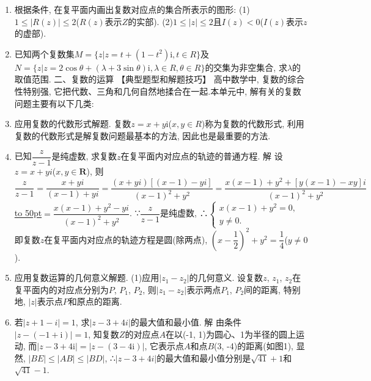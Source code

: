 \documentclass[10pt,a4paper]{article}
\newcommand{\blank}[1]{\underline{\hbox to #1pt{}}}
\begin{document}
\begin{enumerate}[1.]
\item 根据条件, 在复平面内画出复数对应点的集合所表示的图形:
(1)$1\le|R(z)|\le 2$($R(z)$表示$Z$的实部).
(2)$1\le|z|\le 2$且$I(z)<0$($I(z)$表示$z$的虚部).
\item 已知两个复数集$M=\{z|z=t+(1-t^2)\mathrm{i},t\in R\}$及$N=\{z|z=2\cos \theta +(\lambda +3\sin \theta)\mathrm{i},\lambda \in R,\theta \in R\}$的交集为非空集合, 求$\lambda$的取值范围.
二、复数的运算
【典型题型和解题技巧】
高中数学中, 复数的综合性特别强, 它把代数、三角和几何自然地揉合在一起.本单元中, 解有关的复数问题主要有以下几类:
\item 应用复数的代数形式解题.
复数$z=x+y\mathrm{i}$($x,y\in R$)称为复数的代数形式, 利用复数的代数形式是解复数问题最基本的方法, 因此也是最重要的方法.
\item 已知$\dfrac z{z-1}$是纯虚数, 求复数$z$在复平面内对应点的轨迹的普通方程.
解  设$z=x+yi$($x,y\in \mathbf{R}$),
则$\dfrac z{z-1}=\dfrac{x+yi}{(x-1)+yi}=\dfrac{(x+yi)[(x-1)-yi]}{{{(x-1)}^2}+{y^2}}=\dfrac{x(x-1)+{y^2}+[y(x-1)-xy]i}{{{(x-1)}^2}+{y^2}}$
\blank{50}$=\dfrac{x(x-1)+{y^2}-yi}{{{(x-1)}^2}+{y^2}}$.
∵$\dfrac z{z-1}$是纯虚数, ∴$\begin{cases} x(x-1)+y^2=0, \\ y\ne 0. \end{cases}$
即复数$z$在复平面内对应点的轨迹方程是圆(除两点), $(x-\dfrac 12)^2+y^2=\dfrac 14$($y\ne 0$).
\item 应用复数运算的几何意义解题.
(1)应用$|z_1-z_2|$的几何意义.
设复数$z$, $z_1$, $z_2$在复平面内的对应点分别为$P$, $P_1$, $P_2$, 则$|z_1-z_2|$表示两点$P_1$, $P_2$间的距离, 特别地, $|z|$表示点$P$和原点的距离.
\item 若$|z+1-i|=1$, 求$|z-3+4i|$的最大值和最小值.
解  由条件$|z-(-1+\mathrm{i})|=1$, 知复数$Z$的对应点$A$在以(-1, 1)为圆心、1为半径的圆上运动, 而$|z-3+4\mathrm{i}|=|z-(3-4\mathrm{i})|$, 它表示点$A$和点$B$(3, -4)的距离(如图1), 显然, $|BE|\le|AB|\le|BD|$,
∴$|z-3+4i|$的最大值和最小值分别是$\sqrt {41}+1$和$\sqrt {41}-1$.
\begin{center}
\end{center}
\end{enumerate}
\end{document}
